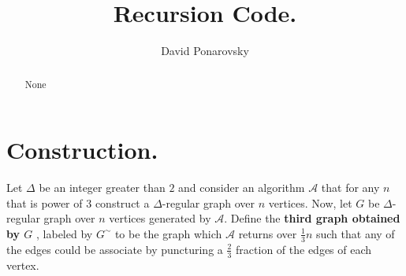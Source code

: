 \documentclass{article}
\begin{document}
\title{Recursion Code.} 
\author{David Ponarovsky}
\maketitle
\begin{abstract}None 
\end{abstract}

\section{Construction.}
\begin{definition} 
  Let $\Delta$ be an integer greater than $2$ and consider an algorithm $\mathcal{A}$ that for any $n$ that is power of $3$ construct a $\Delta$-regular graph over $n$ vertices. Now, let $G$ be $\Delta$-regular graph over $n$ vertices generated by $\mathcal{A}$. Define the \textbf{third graph obtained by $G$ } , labeled by $G^{\sim}$ to be the graph which $\mathcal{A}$ returns over $\frac{1}{3} n$ such that any of the edges could be associate by puncturing a $\frac{2}{3}$ fraction of the edges of each vertex.  
\end{definition}
\end{document}
